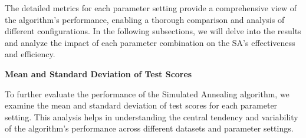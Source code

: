 \documentclass[
]{article}
\begin{document}
    The detailed metrics for each parameter setting provide a comprehensive view of the algorithm's performance, enabling a thorough comparison and analysis of different configurations. In the following subsections, we will delve into the results and analyze the impact of each parameter combination on the SA's effectiveness and efficiency.

    \textbf{Mean and Standard Deviation of Test Scores}

    To further evaluate the performance of the Simulated Annealing algorithm, we examine the mean and standard deviation of test scores for each parameter setting. This analysis helps in understanding the central tendency and variability of the algorithm's performance across different datasets and parameter settings.

    \begin{table}[H]
        \centering
\end{table}
\end{document}
